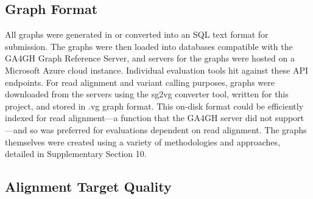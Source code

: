 \subsection{Graph Format}

All graphs were generated in or converted into an SQL text format for
submission. The graphs were then loaded into databases compatible with
the GA4GH Graph Reference Server, and servers for the graphs were hosted
on a Microsoft Azure cloud instance. Individual evaluation tools hit
against these API endpoints. For read alignment and variant calling
purposes, graphs were downloaded from the servers using the sg2vg
converter tool, written for this project, and stored in .vg graph
format. This on-disk format could be efficiently indexed for read
alignment---a function that the GA4GH server did not support---and so
was preferred for evaluations dependent on read alignment. The graphs
themselves were created using a variety of methodologies and approaches,
detailed in Supplementary Section 10.

\subsection{Alignment Target Quality}

